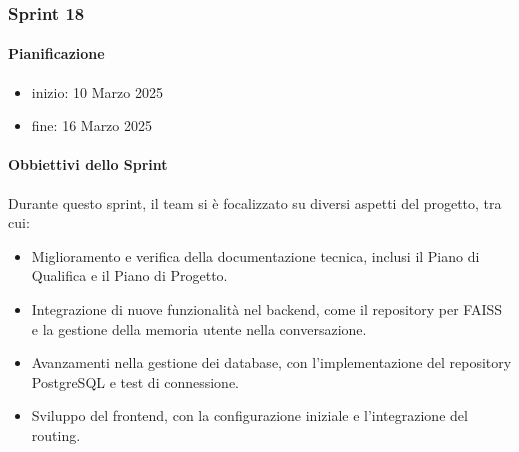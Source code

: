 \documentclass{article}
\begin{document}
            \subsubsection{Sprint 18}
            \paragraph{Pianificazione}
                \begin{itemize}
                    \item inizio: 10 Marzo 2025
                    \item fine: 16 Marzo 2025
                \end{itemize}
        
            \paragraph{Obbiettivi dello Sprint}
            Durante questo sprint, il team si è focalizzato su diversi aspetti del progetto, tra cui:
            \begin{itemize}
                \item Miglioramento e verifica della documentazione tecnica, inclusi il Piano di Qualifica e il Piano di Progetto.
                \item Integrazione di nuove funzionalità nel backend, come il repository per FAISS e la gestione della memoria utente nella conversazione.
                \item Avanzamenti nella gestione dei database, con l'implementazione del repository PostgreSQL e test di connessione.
                \item Sviluppo del frontend, con la configurazione iniziale e l’integrazione del routing.
            \end{itemize}
            
\end{document}
